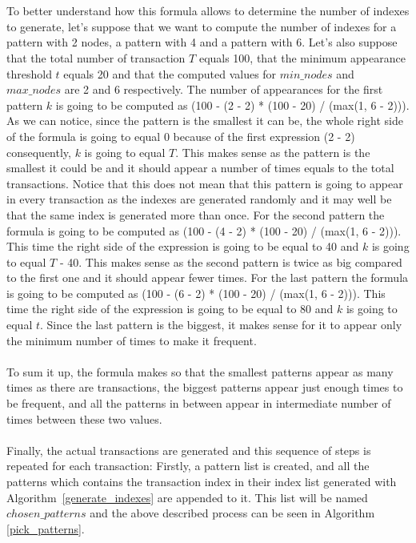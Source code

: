 \documentclass{acm_proc_article-sp-sigmod09}
\begin{document}
\\
\\
To better understand how this formula allows to determine the number of indexes to generate, let's suppose that we want to compute the number of indexes for a pattern with 2 nodes, a pattern with 4 and a pattern with 6. Let's also suppose that the total number of transaction $T$ equals 100, that the minimum appearance threshold $t$ equals 20 and that the computed values for $min\_nodes$ and $max\_nodes$ are 2 and 6 respectively. The number of appearances for the first pattern $k$ is going to be computed as (100 - (2 - 2) * (100 - 20) / (max(1, 6 - 2))). As we can notice, since the pattern is the smallest it can be, the whole right side of the formula is going to equal 0 because of the first expression (2 - 2) consequently, $k$ is going to equal $T$. This makes sense as the pattern is the smallest it could be and it should appear a number of times equals to the total transactions. Notice that this does not mean that this pattern is going to appear in every transaction as the indexes are generated randomly and it may well be that the same index is generated more than once. For the second pattern the formula is going to be computed as (100 - (4 - 2) * (100 - 20) / (max(1, 6 - 2))). This time the right side of the expression is going to be equal to 40 and $k$ is going to equal $T$ - 40. This makes sense as the second pattern is twice as big compared to the first one and it should appear fewer times. For the last pattern the formula is going to be computed as (100 - (6 - 2) * (100 - 20) / (max(1, 6 - 2))). This time the right side of the expression is going to be equal to 80 and $k$ is going to equal $t$. Since the last pattern is the biggest, it makes sense for it to appear only the minimum number of times to make it frequent.
\\\\
To sum it up, the formula makes so that the smallest patterns appear as many times as there are transactions, the biggest patterns appear just enough times to be frequent, and all the patterns in between appear in intermediate number of times between these two values.
\\\\
Finally, the actual transactions are generated and this sequence of steps is repeated for each transaction: Firstly, a pattern list is created, and all the patterns which contains the transaction index in their index list generated with Algorithm~\ref{generate_indexes} are appended to it. This list will be named $chosen\_patterns$ and the above described process can be seen in Algorithm \ref{pick_patterns}.
\end{document}

